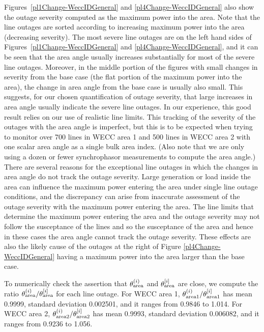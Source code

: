 \documentclass[conference]{IEEEtran}
\begin{document}
 Figures~\ref{pl1Change-WeccIDGeneral} and  \ref{pl4Change-WeccIDGeneral} also show the outage severity computed as the maximum power into the area.
  Note that the line outages are sorted according to increasing  maximum power into the area (decreasing  severity). The most severe line outages are on the left hand sides of Figures~\ref{pl1Change-WeccIDGeneral} and  \ref{pl4Change-WeccIDGeneral}, and it 
  can be seen that the area angle usually increases substantially for  most of the severe line outages.  Moreover, in the middle portion of the figures with small changes in severity from the base case (the flat portion of the maximum
  power into the area), the change in area angle from the base case is usually also small.  
  This suggests, for our chosen quantification of outage severity, that large increases in area angle 
  usually indicate the severe line outages. 
  In our experience, this good  result relies on our use of  realistic line limits.
   This tracking of the severity of the outages with the area angle is imperfect, but 
    this is to be expected when trying to monitor over 700 lines in WECC area 1 and 500 lines in WECC area 2 with one scalar area angle as a single bulk area index. (Also note that we are only using a dozen or fewer synchrophasor measurements 
    to compute the area angle.)
   There are several reasons for the exceptional line outages in which the changes in area angle do not track the outage severity.
    Large generation or load inside the area can influence the maximum power entering the area under single line outage conditions,
    and the discrepancy can arise from inaccurate assessment of the outage severity with the maximum power entering the area.
    The line limits that determine the maximum power entering the area and the outage severity
   may not follow the susceptance of the lines and so the susceptance of the area and hence in these cases the area angle cannot track the outage severity. These effects are also the likely cause of the outages at the right of Figure  \ref{pl4Change-WeccIDGeneral} having a maximum power into the area larger than the base case.    

To numerically check the assertion that  $\theta_{\rm area}^{(i)}$ and $\theta_{\rm area}^{[i]}$  are close,  we compute the ratio $\theta_{\rm area}^{(i)}/\theta_{\rm area}^{[i]}$ for each line outage. 
For WECC area 1,
 $\theta_{\rm area1}^{(i)}/\theta_{\rm area1}^{[i]}$ has mean  0.9999, standard deviation 0.002501, and it ranges from 0.9846 to 1.014.
For WECC area 2,
 $\theta_{\rm area2}^{(i)}/\theta_{\rm area2}^{[i]}$ has mean  0.9993, standard deviation 0.006082, and it ranges from 0.9236 to 1.056.
\end{document}
